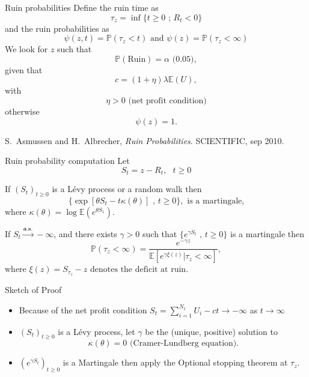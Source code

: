 \documentclass{beamer}
\begin{document}
\begin{frame}{Ruin probabilities}
\scriptsize
Define the ruin time as 
$$
\tau_z = \inf\{t\geq0\text{ ; }R_t <0\}
$$
and the ruin probabilities as 
$$
\psi(z,t) = \mathbb{P}(\tau_z < t)\text{ and }\psi(z) = \mathbb{P}(\tau_z < \infty)
$$
We look for $z$ such that 
$$
\mathbb{P}(\text{Ruin}) = \alpha\text{ (0.05)},
$$
given that 
$$
c=(1+\eta)\lambda\mathbb{E}(U),
$$
with 
$$\eta>0\text{ (net profit condition)}$$  
otherwise 
$$\psi(z)=1.$$

\tiny
\begin{thebibliography}{1}

S.~Asmussen and H.~Albrecher, {\em Ruin Probabilities}.
 {SCIENTIFIC}, sep 2010.

\end{thebibliography}

\end{frame}

\begin{frame}{Ruin probability computation}
\scriptsize
Let 
$$
S_t = z - R_t,\text{ }t\geq0
$$
\begin{tcolorbox}[enhanced,drop shadow, title=Theorem (Wald exponential martingale)]
If $(S_t)_{t\geq0}$ is a L\'evy process or a random walk then
$$
\{\exp\left[\theta S_t-t\kappa(\theta)\right]\text{ , }t\geq0\},\text{ is a martingale,}
$$
where $\kappa(\theta)=\log\mathbb{E}\left(e^{\theta S_1}\right)$.
\end{tcolorbox}
\begin{tcolorbox}[enhanced,drop shadow, title=Theorem (Representation of the ruin probability)]

If $S_t\overset{\textbf{a.s.}}{\rightarrow} -\infty$, and there exists $\gamma>0$ such that $\{e^{\gamma S_t}\text{ , }t\geq0\}$ is a martingale then
$$
\mathbb{P}(\tau_z<\infty)=\frac{e^{-\gamma z}}{\mathbb{E}\left[e^{\gamma \xi(z)}|\tau_z<\infty\right]},
$$
where $\xi(z)=S_{\tau_z}-z\text{ denotes the deficit at ruin.}$
\end{tcolorbox}
\end{frame}
\begin{frame}{Sketch of Proof}
\scriptsize
\begin{itemize}
\item Because of the net profit condition $S_t = \sum_{i=1}^{N_t}U_i-ct\rightarrow -\infty$ as $t\rightarrow\infty$
\item $(S_t)_{t\geq0}$ is a Lévy process, let $\gamma$ be the (unique, positive) solution to
$$
\kappa(\theta) = 0\text{ (Cramer-Lundberg equation)}.
$$
\item  $(e^{\gamma S_t})_{t\geq0}$ is a Martingale then apply the Optional stopping theorem at $\tau_z$.

\end{itemize}
\end{frame}
\end{document}
